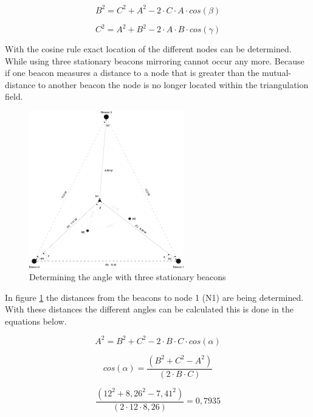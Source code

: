 \documentclass[10pt,a4paper]{article}
\begin{document}
\begin{equation}
B^2 = C^2 + A^2 - 2\cdot C\cdot A\cdot cos(\beta)
\end{equation}

\begin{equation}
C^2 = A^2 + B^2 - 2\cdot A\cdot B\cdot cos(\gamma)
\end{equation}

With the cosine rule exact location of the different nodes can be determined. While using three stationary beacons mirroring cannot occur any more. Because if one beacon measures a distance to a node that is greater than the mutual-distance to another beacon the node is no longer located within the triangulation field.

\begin{figure}[H]
\centering
\includegraphics[width=0.6\textwidth]{triangulatie.pdf}
\caption{Determining the angle with three stationary beacons}
\label{triangulatie}
\end{figure}

In figure \ref{triangulatie} the distances from the beacons to node 1 (N1) are being determined. With these distances the different angles can be calculated this is done in the equations below.

\begin{equation}
A^2 = B^2 + C^2 - 2\cdot B\cdot C\cdot cos(\alpha)
\end{equation}

\begin{equation}
\label{eq:hoek}
cos(\alpha) = \frac{(B^2 + C^2 - A^2)}{(2\cdot B\cdot C)}
\end{equation}

\begin{equation}
\label{eq:hoek}
\frac{(12^2 + 8,26^2 - 7,41^2)}{(2\cdot12\cdot8,26)} = 0,7935
\end{equation}
\end{document}
